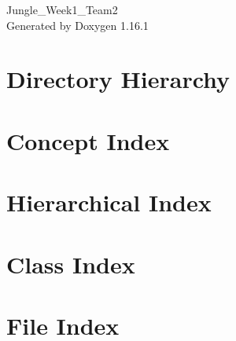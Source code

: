 \documentclass[twoside]{book}
\newcommand{\+}{\discretionary{\mbox{\scriptsize$\hookleftarrow$}}{}{}}
\newcommand{\clearemptydoublepage}{%
    \newpage{\pagestyle{empty}\cleardoublepage}%
  }
\begin{document}
  \raggedbottom
    \hypersetup{pageanchor=false,
                bookmarksnumbered=true,
                pdfencoding=unicode
               }
  \begin{titlepage}
  \vspace*{7cm}
  \begin{center}%
  {\Large Jungle\+\_\+\+Week1\+\_\+\+Team2}\\
  \vspace*{1cm}
  {\large Generated by Doxygen 1.16.1}\\
  \end{center}
  \end{titlepage}
  \clearemptydoublepage
  \tableofcontents
  \clearemptydoublepage
  \hypersetup{pageanchor=true}
\chapter{Directory Hierarchy}

\chapter{Concept Index}

\chapter{Hierarchical Index}

\chapter{Class Index}

\chapter{File Index}

\end{document}

